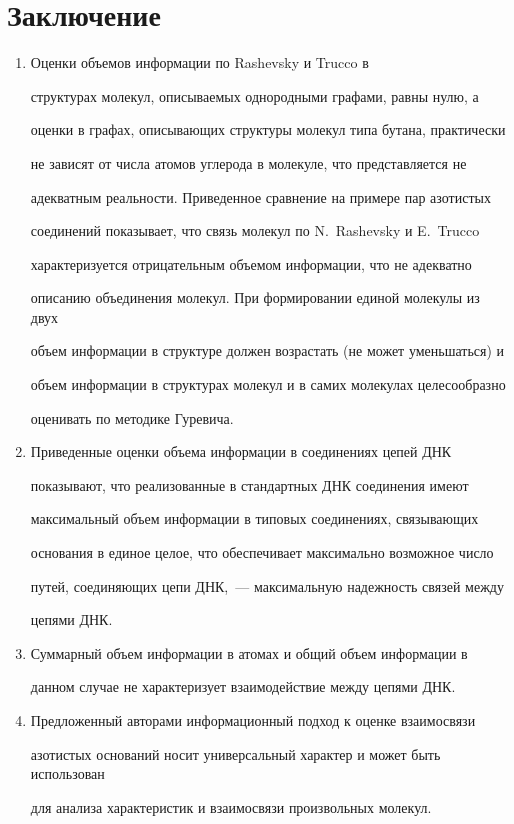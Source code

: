 









\section{Заключение}


   


   \noindent


   \begin{enumerate}[1.]


   \item Оценки объемов информации по Rashevsky и Trucco в 


структурах молекул, описываемых однородными графами, равны нулю, а 


оценки в графах, описывающих структуры молекул типа бутана, практически 


не зависят от числа атомов углерода в молекуле, что представляется не 


адекватным реальности. Приведенное сравнение на примере пар азотистых 


соединений показывает, что связь молекул по N.~Rashevsky и E.~Trucco 


характеризуется отрицательным объемом информации, что не адекватно 


описанию объединения молекул. При формировании единой молекулы из двух 


объем информации в структуре должен возрастать (не может уменьшаться) и 


объем информации в структурах молекул и в самих молекулах целесообразно 


оценивать по методике Гуревича.


\item Приведенные оценки объема информации в соединениях цепей ДНК 


показывают, что реализованные в стандартных ДНК соединения имеют 


максимальный объем информации в типовых соединениях, связывающих 


основания в единое целое, что обеспечивает максимально возможное число 


путей, соединяющих цепи ДНК,~--- максимальную надежность связей между 


цепями ДНК.


\item Суммарный объем информации в атомах и общий объем информации в 


данном случае не характеризует взаимодействие между цепями ДНК. 


\item Предложенный авторами информационный подход к оценке взаимосвязи 


азотистых оснований носит универсальный характер и может быть использован 


для анализа характеристик и взаимосвязи произвольных молекул.


\end{enumerate}
